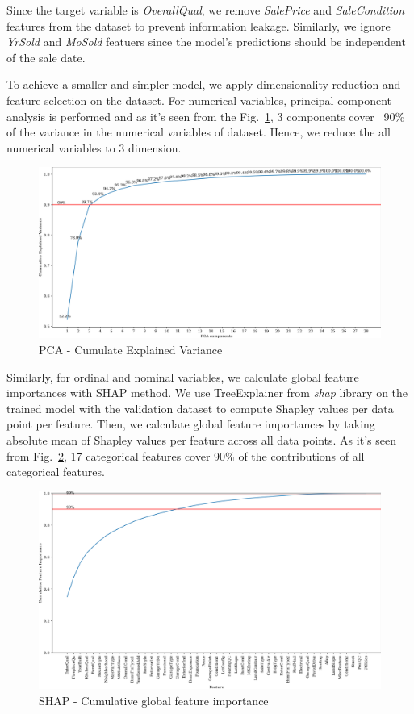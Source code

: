 \documentclass[conference]{IEEEtran}
\begin{document}
Since the target variable is \textit{OverallQual}, 
we remove \textit{SalePrice} and \textit{SaleCondition} features from the dataset to prevent information leakage.
Similarly, we ignore \textit{YrSold} and \textit{MoSold} featuers since the model's predictions should be independent of the sale date.

To achieve a smaller and simpler model, we apply dimensionality reduction and feature selection on the dataset.
For numerical variables, principal component analysis is performed and 
as it's seen from the Fig.~\ref{fig:pca-cumulative-explained-variance},
3 components cover ~90\% of the variance in the numerical variables of dataset. 
Hence, we reduce the all numerical variables to 3 dimension.
\begin{figure}[htbp]
    \centerline{\includegraphics[width = 0.5 \textwidth]{pca-cumulative-explained-variance.png}}
    \caption{PCA - Cumulate Explained Variance}
    \label{fig:pca-cumulative-explained-variance}
\end{figure}

Similarly, for ordinal and nominal variables, we calculate global feature importances with SHAP method. 
We use TreeExplainer from \textit{shap} library \cite{tree-explainer} on the trained model with the validation dataset
to compute Shapley values per data point per feature. Then, we calculate global feature 
importances by taking absolute mean of Shapley values per feature across all data points.
As it's seen from Fig.~\ref{fig:shap-cumulative-feature-importance}, 17 categorical features cover 
90\% of the contributions of all categorical features.
\begin{figure}[htbp]
    \centerline{\includegraphics[width = 0.5 \textwidth]{shap-cumulative-feature-importance.png}}
    \caption{SHAP - Cumulative global feature importance}
    \label{fig:shap-cumulative-feature-importance}
\end{figure}
\end{document}
